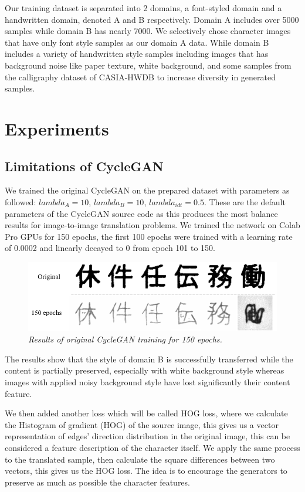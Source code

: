 \documentclass[12pt]{report}
\begin{document}
Our training dataset is separated into 2 domains, a font-styled domain and a handwritten domain, denoted A and B respectively. Domain A includes over 5000 samples while domain B has nearly 7000. We selectively chose character images that have only font style samples as our domain A data. While domain B includes a variety of handwritten style samples including images that has background noise like paper texture, white background, and some samples from the calligraphy dataset of CASIA-HWDB\cite{casia} to increase diversity in generated samples.

\section{Experiments}

\subsection{Limitations of CycleGAN}

We trained the original CycleGAN on the prepared dataset with parameters as followed: $lambda_A = 10$, $lambda_B = 10$, $lambda_{idt} = 0.5$. These are the default parameters of the CycleGAN source code as this produces the most balance results for image-to-image translation problems. We trained the network on Colab Pro GPUs for 150 epochs, the first 100 epochs were trained with a learning rate of 0.0002 and linearly decayed to 0 from epoch 101 to 150.

\begin{figure}[h]
	\centering
	\includegraphics[scale=0.8]{150-epochs}
	\caption{\textit{Results of original CycleGAN training for 150 epochs.}}
	\label{fig:150-epochs}
\end{figure}

The results show that the style of domain B is successfully transferred while the content is partially preserved, especially with white background style whereas images with applied noisy background style have lost significantly their content feature.

We then added another loss which will be called HOG loss, where we calculate the Histogram of gradient (HOG) \cite{hog} of the source image, this gives us a vector representation of edges' direction distribution in the original image, this can be considered a feature description of the character itself. We apply the same process to the translated sample, then calculate the square differences between two vectors, this gives us the HOG loss. The idea is to encourage the generators to preserve as much as possible the character features.
\end{document}
